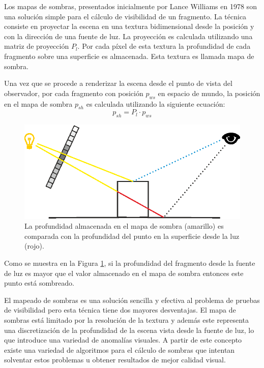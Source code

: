 Los mapas de sombras, presentados inicialmente por Lance Williams en 1978 \cite{Williams:78} son una solución simple para el cálculo de visibilidad de un fragmento. La técnica consiste en proyectar la escena en una textura bidimensional desde la posición y con la dirección de una fuente de luz. La proyección es calculada utilizando una matriz de proyección $P_{l}$. Por cada píxel de esta textura la profundidad de cada fragmento sobre una superficie es almacenada. Esta textura es llamada mapa de sombra.

Una vez que se procede a renderizar la escena desde el punto de vista del observador, por cada fragmento con posición $p_{ws}$ en espacio de mundo, la posición en el mapa de sombra $p_{sh}$ es calculada utilizando la siguiente ecuación:
\begin{equation}
    p_{sh} = P_{l} \cdot p_{ws}
    \label{eq:p_to_shadowmap}
\end{equation}
\begin{figure}[H]
	\centering
	\includegraphics[width=0.80\linewidth]{media/shadow_mapping.eps}
	\caption{La profundidad almacenada en el mapa de sombra (amarillo) es comparada con la profundidad del punto en la superficie desde la luz (rojo).}
	\label{fig:shadow_mapping}
\end{figure}
Como se muestra en la Figura \ref{fig:shadow_mapping}, si la profundidad del fragmento desde la fuente de luz es mayor que el valor almacenado en el mapa de sombra entonces este punto está sombreado.

El mapeado de sombras es una solución sencilla y efectiva al problema de pruebas de visibilidad pero esta técnica tiene dos mayores desventajas. El mapa de sombras está limitado por la resolución de la textura y además este representa una discretización de la profundidad de la escena vista desde la fuente de luz, lo que introduce una variedad de anomalías visuales. A partir de este concepto existe una variedad de algoritmos para el cálculo de sombras que intentan solventar estos problemas u obtener resultados de mejor calidad visual.

